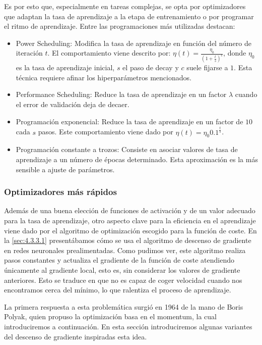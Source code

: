 Es por esto que, especialmente en tareas complejas, se opta por optimizadores que adaptan la tasa de aprendizaje a la etapa de entrenamiento o por programar el ritmo de aprendizaje. Entre las programaciones más utilizadas destacan: 

\begin{itemize}
    \item Power Scheduling: Modifica la tasa de aprendizaje en función del número de iteración $t$. El comportamiento viene descrito por: $\eta (t) = \frac{\eta_0}{(1+\frac{t}{s})^c} $, donde $\eta_0$ es la tasa de aprendizaje inicial, $s$ el paso de decay y $c$ suele fijarse a $1$. Esta técnica requiere afinar los hiperparámetros mencionados.
    \item Performance Scheduling: Reduce la tasa de aprendizaje en un factor $\lambda$ cuando el error de validación deja de decaer. 
    
    \item Programación exponencial: Reduce la tasa de aprendizaje en un factor de $10$ cada $s$ pasos. Este comportamiento viene dado por $\eta(t)=\eta_0 0.1^{\frac{t}{s}}$. 
    \item Programación constante a trozos: Consiste en asociar valores de tasa de aprendizaje a un número de épocas determinado. Esta aproximación es la más sensible a ajuste de parámetros. 
\end{itemize}

\subsubsection{Optimizadores más rápidos}

Además de una buena elección de funciones de activación y de un valor adecuado para la tasa de aprendizaje, otro aspecto clave para la eficiencia en el aprendizaje viene dado por el algoritmo de optimización escogido para la función de coste. En la \autoref{sec:4.3.3.1} presentábamos cómo se usa el algoritmo de descenso de gradiente en redes neuronales prealimentadas. Como pudimos ver, este algoritmo realiza pasos constantes y actualiza el gradiente de la función de coste atendiendo únicamente al gradiente local, esto es, sin considerar los valores de gradiente anteriores. Esto se traduce en que no es capaz de coger velocidad cuando nos encontramos cerca del mínimo, lo que ralentiza el proceso de aprendizaje. 

La primera respuesta a esta problemática surgió en 1964 de la mano de Boris Polyak, quien propuso la optimización basa en el momentum, la cual introduciremos a continuación. En esta sección introduciremos algunas variantes del descenso de gradiente inspiradas esta idea. 

